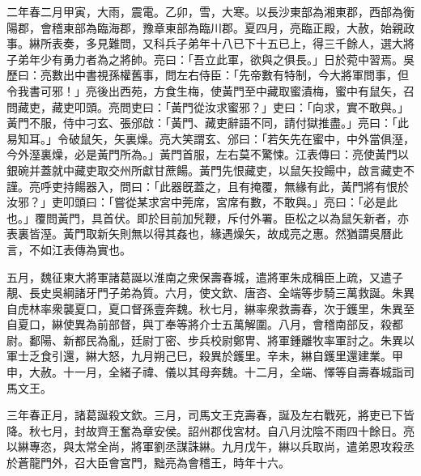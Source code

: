 \begin{pinyinscope}
二年春二月甲寅，大雨，震電。乙卯，雪，大寒。以長沙東部為湘東郡，西部為衡陽郡，會稽東部為臨海郡，豫章東部為臨川郡。夏四月，亮臨正殿，大赦，始親政事。綝所表奏，多見難問，又科兵子弟年十八已下十五已上，得三千餘人，選大將子弟年少有勇力者為之將帥。亮曰：「吾立此軍，欲與之俱長。」日於菀中習焉。吳歷曰：亮數出中書視孫權舊事，問左右侍臣：「先帝數有特制，今大將軍問事，但令我書可邪！」亮後出西苑，方食生梅，使黃門至中藏取蜜漬梅，蜜中有鼠矢，召問藏吏，藏吏叩頭。亮問吏曰：「黃門從汝求蜜邪？」吏曰：「向求，實不敢與。」黃門不服，侍中刁玄、張邠啟：「黃門、藏吏辭語不同，請付獄推盡。」亮曰：「此易知耳。」令破鼠矢，矢裏燥。亮大笑謂玄、邠曰：「若矢先在蜜中，中外當俱溼，今外溼裏燥，必是黃門所為。」黃門首服，左右莫不驚悚。江表傳曰：亮使黃門以銀碗并蓋就中藏吏取交州所獻甘蔗餳。黃門先恨藏吏，以鼠矢投餳中，啟言藏吏不謹。亮呼吏持餳器入，問曰：「此器旣蓋之，且有掩覆，無緣有此，黃門將有恨於汝邪？」吏叩頭曰：「嘗從某求宮中莞席，宮席有數，不敢與。」亮曰：「必是此也。」覆問黃門，具首伏。即於目前加髠鞭，斥付外署。臣松之以為鼠矢新者，亦表裏皆溼。黃門取新矢則無以得其姦也，緣遇燥矢，故成亮之惠。然猶謂吳曆此言，不如江表傳為實也。

五月，魏征東大將軍諸葛誕以淮南之衆保壽春城，遣將軍朱成稱臣上疏，又遣子靚、長史吳綱諸牙門子弟為質。六月，使文欽、唐咨、全端等步騎三萬救誕。朱異自虎林率衆襲夏口，夏口督孫壹奔魏。秋七月，綝率衆救壽春，次于鑊里，朱異至自夏口，綝使異為前部督，與丁奉等將介士五萬解圍。八月，會稽南部反，殺都尉。鄱陽、新都民為亂，廷尉丁密、步兵校尉鄭冑、將軍鍾離牧率軍討之。朱異以軍士乏食引還，綝大怒，九月朔己巳，殺異於鑊里。辛未，綝自鑊里還建業。甲申，大赦。十一月，全緒子禕、儀以其母奔魏。十二月，全端、懌等自壽春城詣司馬文王。

三年春正月，諸葛誕殺文欽。三月，司馬文王克壽春，誕及左右戰死，將吏已下皆降。秋七月，封故齊王奮為章安侯。詔州郡伐宮材。自八月沈陰不雨四十餘日。亮以綝專恣，與太常全尚，將軍劉丞謀誅綝。九月戊午，綝以兵取尚，遣弟恩攻殺丞於蒼龍門外，召大臣會宮門，黜亮為會稽王，時年十六。


\end{pinyinscope}